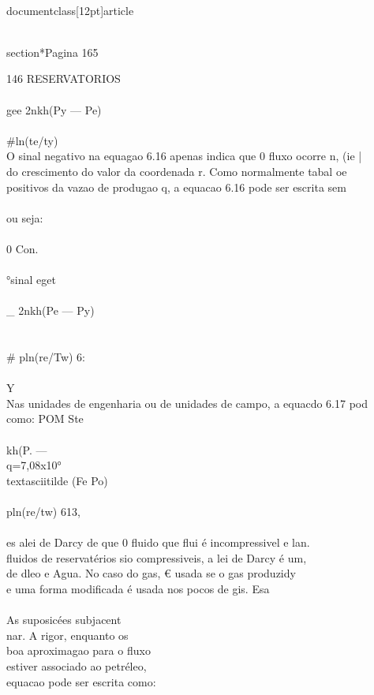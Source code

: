 \\documentclass[12pt]{article}
\begin{document}
\\section*{Pagina 165}

146 RESERVATORIOS\\
\\
gee 2nkh(Py — Pe)\\
\\#ln(te/ty)\\
O sinal negativo na equagao 6.16 apenas indica que 0 fluxo ocorre n, (ie |\\
do crescimento do valor da coordenada r. Como normalmente tabal oe\\
positivos da vazao de produgao q, a equacao 6.16 pode ser escrita sem\\
\\
ou seja:\\
\\
0 Con.\\
\\
°sinal eget\\
\\_ 2nkh(Pe — Py)\\
\\
\\# pln(re/Tw) 6:\\
\\
Y\\
Nas unidades de engenharia ou de unidades de campo, a equacdo 6.17 pod\\
como: POM Ste\\
\\
kh(P. —\\
q=7,08x10°\\textasciitilde{} (Fe Po)\\
\\
pln(re/tw) 613,\\
\\
es alei de Darcy de que 0 fluido que flui é incompressivel e lan.\\
fluidos de reservatérios sio compressiveis, a lei de Darcy é um,\\
de dleo e Agua. No caso do gas, € usada se o gas produzidy\\
e uma forma modificada é usada nos pocos de gis. Esa\\
\\
As suposicées subjacent\\
nar. A rigor, enquanto os\\
boa aproximagao para o fluxo\\
estiver associado ao petréleo,\\
equacao pode ser escrita como:\\
\end{document}
